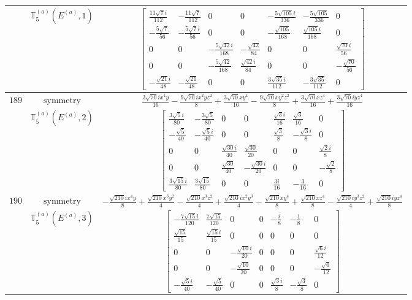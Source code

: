 \documentclass[fleqn,8pt,landscape]{jsarticle}
\begin{document}
\begin{longtable}{ccc}
$  $ & $ \mathbb{T}_{5}^{(a)}(E^{(a)},1) $ & $ \begin{bmatrix} \frac{11 \sqrt{7} i}{112} & - \frac{11 \sqrt{7}}{112} & 0 & 0 & - \frac{5 \sqrt{105} i}{336} & - \frac{5 \sqrt{105}}{336} & 0 \\ - \frac{5 \sqrt{7}}{56} & - \frac{5 \sqrt{7} i}{56} & 0 & 0 & - \frac{\sqrt{105}}{168} & \frac{\sqrt{105} i}{168} & 0 \\ 0 & 0 & - \frac{5 \sqrt{42} i}{168} & - \frac{\sqrt{42}}{84} & 0 & 0 & \frac{\sqrt{70} i}{56} \\ 0 & 0 & - \frac{5 \sqrt{42}}{168} & \frac{\sqrt{42} i}{84} & 0 & 0 & - \frac{\sqrt{70}}{56} \\ - \frac{\sqrt{21} i}{48} & - \frac{\sqrt{21}}{48} & 0 & 0 & \frac{3 \sqrt{35} i}{112} & - \frac{3 \sqrt{35}}{112} & 0 \end{bmatrix} $ \\ \hline
$ 189 $ & $ \text{symmetry} $ & $ \frac{3 \sqrt{70} i x^{4} y}{16} - \frac{9 \sqrt{70} i x^{2} y z^{2}}{8} + \frac{3 \sqrt{70} x y^{4}}{16} - \frac{9 \sqrt{70} x y^{2} z^{2}}{8} + \frac{3 \sqrt{70} x z^{4}}{16} + \frac{3 \sqrt{70} i y z^{4}}{16} $ \\
$  $ & $ \mathbb{T}_{5}^{(a)}(E^{(a)},2) $ & $ \begin{bmatrix} \frac{3 \sqrt{5} i}{80} & - \frac{3 \sqrt{5}}{80} & 0 & 0 & \frac{\sqrt{3} i}{16} & \frac{\sqrt{3}}{16} & 0 \\ - \frac{\sqrt{5}}{40} & - \frac{\sqrt{5} i}{40} & 0 & 0 & \frac{\sqrt{3}}{8} & - \frac{\sqrt{3} i}{8} & 0 \\ 0 & 0 & \frac{\sqrt{30} i}{40} & \frac{\sqrt{30}}{20} & 0 & 0 & \frac{\sqrt{2} i}{8} \\ 0 & 0 & \frac{\sqrt{30}}{40} & - \frac{\sqrt{30} i}{20} & 0 & 0 & - \frac{\sqrt{2}}{8} \\ \frac{3 \sqrt{15} i}{80} & \frac{3 \sqrt{15}}{80} & 0 & 0 & \frac{3 i}{16} & - \frac{3}{16} & 0 \end{bmatrix} $ \\ \hline
$ 190 $ & $ \text{symmetry} $ & $ - \frac{\sqrt{210} i x^{4} y}{8} + \frac{\sqrt{210} x^{3} y^{2}}{4} - \frac{\sqrt{210} x^{3} z^{2}}{4} + \frac{\sqrt{210} i x^{2} y^{3}}{4} - \frac{\sqrt{210} x y^{4}}{8} + \frac{\sqrt{210} x z^{4}}{8} - \frac{\sqrt{210} i y^{3} z^{2}}{4} + \frac{\sqrt{210} i y z^{4}}{8} $ \\
$  $ & $ \mathbb{T}_{5}^{(a)}(E^{(a)},3) $ & $ \begin{bmatrix} - \frac{7 \sqrt{15} i}{120} & \frac{7 \sqrt{15}}{120} & 0 & 0 & - \frac{i}{8} & - \frac{1}{8} & 0 \\ \frac{\sqrt{15}}{15} & \frac{\sqrt{15} i}{15} & 0 & 0 & 0 & 0 & 0 \\ 0 & 0 & - \frac{\sqrt{10} i}{20} & 0 & 0 & 0 & \frac{\sqrt{6} i}{12} \\ 0 & 0 & - \frac{\sqrt{10}}{20} & 0 & 0 & 0 & - \frac{\sqrt{6}}{12} \\ - \frac{\sqrt{5} i}{40} & - \frac{\sqrt{5}}{40} & 0 & 0 & \frac{\sqrt{3} i}{8} & - \frac{\sqrt{3}}{8} & 0 \end{bmatrix} $ \\ \hline

\end{longtable}
\end{document}
